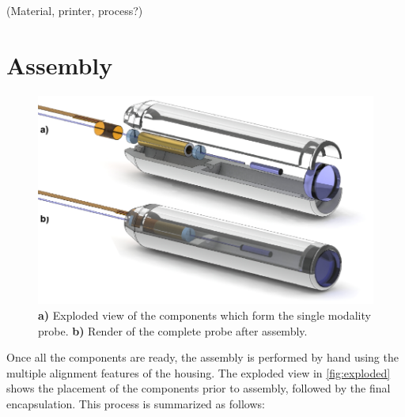 (Material, printer, process?)

%

\section{Assembly}

%

\begin{figure}[h!]\centering \includegraphics{figures/40_Fabrication/Assy/explodedRender/explodedRender.pdf}
      \caption{\textbf{a)} Exploded view of the components which form the single modality probe.
      \textbf{b)} Render of the complete probe after assembly.}
      \label{fig:exploded}
\end{figure}
Once all the components are ready, the assembly is performed by hand using the multiple alignment features of the housing. The exploded view in \autoref{fig:exploded} shows the placement of the components prior to assembly, followed by the final encapsulation. This process is summarized as follows:

